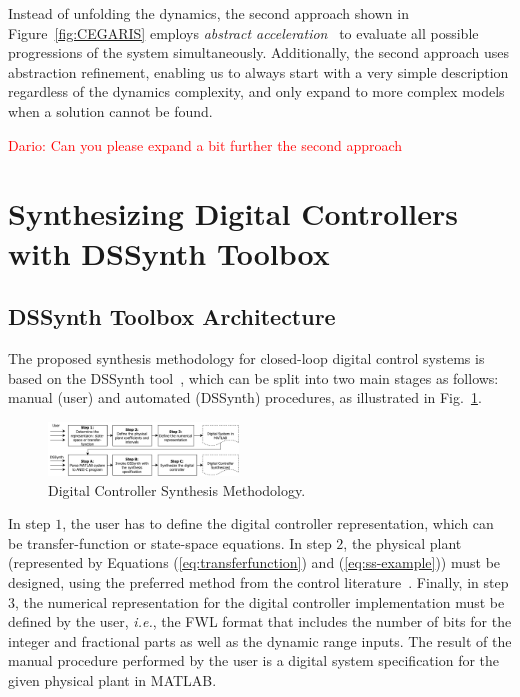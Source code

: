 \documentclass[10pt,conference]{IEEEtran}
\newcommand\tool{{DSSynth Toolbox}\xspace}
\begin{document}
Instead of unfolding the dynamics, the second approach shown in Figure~\ref{fig:CEGARIS}
employs {\em abstract acceleration}~\cite{cattaruzza2015unbounded} to
evaluate all possible progressions of the system simultaneously. 
Additionally, the second approach uses abstraction refinement,
enabling us to always start with a very simple description regardless of the
dynamics complexity, and only expand to more complex models
when a solution cannot be found.

\textcolor{red}{Dario: Can you please expand a bit further the second approach}


\section{Synthesizing Digital Controllers with \tool}

\subsection{\tool Architecture}

The proposed synthesis methodology for closed-loop digital control
systems is based on the DSSynth tool~\cite{abate2017, abatecav2017}, 
which can be split into two main stages as follows: manual (user) and 
automated (DSSynth) procedures, as illustrated in Fig.~\ref{fig:synthesis-flow}. 
%
\begin{figure}[ht!]
\centering
\includegraphics[width=0.45\textwidth]{synthesis-flow.pdf}
\caption{Digital Controller Synthesis Methodology.}
\label{fig:synthesis-flow}
\end{figure}

In step $1$, the user has to define the digital controller representation, 
which can be transfer-function or state-space equations. 
In step $2$, the physical plant (represented by Equations (\ref{eq:transferfunction}) 
and (\ref{eq:ss-example})) must be designed, using the preferred method 
from the control literature~\cite{astrom1997computer}. Finally, in step $3$, 
the numerical representation for the digital controller implementation must be 
defined by the user, {\it i.e.}, the FWL format that includes the number of bits for the integer 
and fractional parts as well as the dynamic range inputs. The result of the manual 
procedure performed by the user is a digital system specification for the given 
physical plant in MATLAB. 
\end{document}
